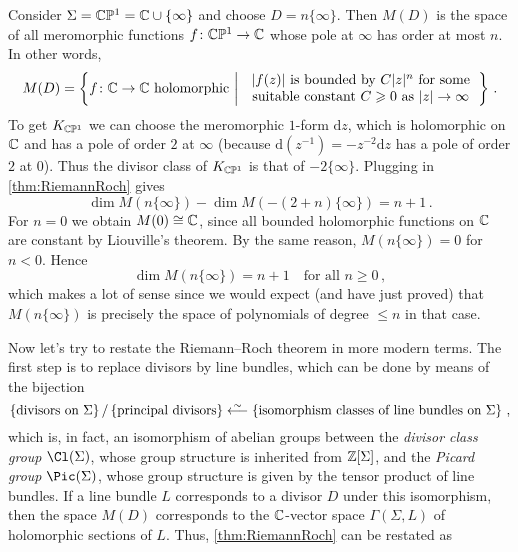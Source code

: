 \documentclass[a4paper, 10pt, oneside, DIV=9, chapterprefix=true, numbers=enddot,bibliography=totoc]{scrbook}
\begin{document}
	\begin{exm}
		Consider $\Sigma=\mathbb{C}\mathbb{P}^1=\mathbb{C}\cup\{\infty\}$ and choose $D=n\{\infty\}$. Then $M(D)$ is the space of all meromorphic functions $f\colon\IC\IP^1\morphism \IC$ whose pole at $\infty$ has order at most $n$. In other words,
		\begin{equation*}
			M(D)=\left\{f\colon \IC\rightarrow\IC\text{ holomorphic}\st \begin{tabular}{c}
				$|f(z)|$ is bounded by $C|z|^n$ for some\\ suitable constant $C\geq 0$ as $|z|\to\infty$
			\end{tabular}\right\}\,.
		\end{equation*}
		To get $K_{\mathbb{C}\mathbb{P}^1}$ we can choose the meromorphic $1$-form $\mathrm dz$, which is holomorphic on $\mathbb{C}$ and has a pole of order $2$ at $\infty$ (because $\mathrm d(z^{-1})=-z^{-2}\mathrm dz$ has a pole of order $2$ at $0$). Thus the divisor class of $K_{\mathbb{C}\mathbb{P}^1}$ is that of $-2\{\infty\}$. Plugging in \cref{thm:RiemannRoch} gives
		\begin{equation*}
			\dim M(n\{\infty\})-\dim M(-(2+n)\{\infty\})=n+1\,.
		\end{equation*}
		For $n=0$ we obtain $M(0)\cong\mathbb{C}$, since all bounded holomorphic functions on $\mathbb{C}$ are constant by Liouville's theorem. By the same reason, $M(n\{\infty\})=0$ for $n<0$. Hence
		\begin{equation*}
			\dim M(n\{\infty\})=n+1\quad\text{for all }n\geq 0\,,
		\end{equation*}
		which makes a lot of sense since we would expect (and have just proved) that $M(n\{\infty\})$ is precisely the space of polynomials of degree $\leq n$ in that case.
	\end{exm}
	Now let's try to restate the Riemann--Roch theorem in more modern terms. The first step is to replace divisors by line bundles, which can be done by means of the bijection
	\begin{equation*}
		\left\{\text{divisors on }\Sigma\right\}/\left\{\text{principal divisors}\right\}\lisomorphism \left\{\text{isomorphism classes of line bundles on }\Sigma\right\}\,,
	\end{equation*}
	which is, in fact, an isomorphism of abelian groups between the \emph{divisor class group} $\Cl(\Sigma)$, whose group structure is inherited from $\mathbb{Z}[\Sigma]$, and the \emph{Picard group} $\Pic(\Sigma)$, whose group structure is given by the tensor product of line bundles. If a line bundle $L$ corresponds to a divisor $D$ under this isomorphism, then the space $M(D)$ corresponds to the $\mathbb{C}$-vector space $\Gamma(\Sigma,L)$ of holomorphic sections of $L$. Thus, \cref{thm:RiemannRoch} can be restated as
\end{document}
